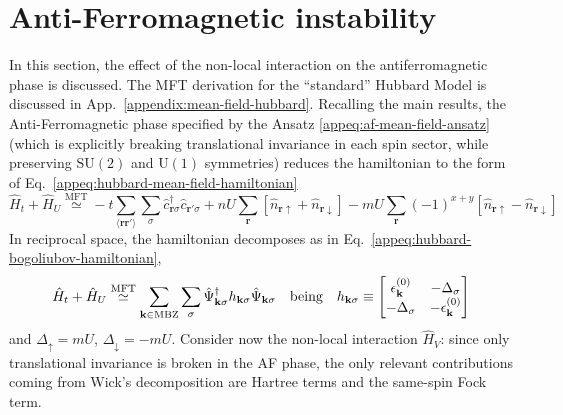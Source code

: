 \todo

\section{Anti-Ferromagnetic instability} 

In this section, the effect of the non-local interaction on the antiferromagnetic phase is discussed. The MFT derivation for the ``standard'' Hubbard Model is discussed in App.~\ref{appendix:mean-field-hubbard}. Recalling the main results, the Anti-Ferromagnetic phase specified by the Ansatz \eqref{appeq:af-mean-field-ansatz} (which is explicitly breaking translational invariance in each spin sector, while preserving $\mathrm{SU}(2)$ and $\mathrm{U}(1)$ symmetries) reduces the hamiltonian to the form of Eq.~\eqref{appeq:hubbard-mean-field-hamiltonian}
\[
	\hat H_t + \hat H_U \stackrel{\mathrm{MFT}}{\simeq} -t \sum_{\langle \mathbf{r}\mathbf{r}' \rangle} \sum_\sigma \hat c_{\mathbf{r}\sigma}^\dagger \hat c_{\mathbf{r}'\sigma}
	+ nU \sum_\mathbf{r} \left[
	\hat n_{\mathbf{r}\uparrow} + \hat n_{\mathbf{r}\downarrow}
	\right] - mU \sum_\mathbf{r} (-1)^{x+y} \left[
	\hat n_{\mathbf{r}\uparrow} - \hat n_{\mathbf{r}\downarrow}
	\right]
\]
In reciprocal space, the hamiltonian decomposes as in Eq.~\eqref{appeq:hubbard-bogoliubov-hamiltonian},
\[
	\hat H_t + \hat H_U \stackrel{\mathrm{MFT}}{\simeq} \sum_{\mathbf{k} \in \mathrm{MBZ}} \sum_\sigma \hat \Psi_{\mathbf{k}\sigma}^\dagger h_{\mathbf{k}\sigma} \hat \Psi_{\mathbf{k}\sigma}
	\qq{being}
	h_{\mathbf{k}\sigma} \equiv \begin{bmatrix}
		\epsilon_\mathbf{k}^{(0)} & -\Delta_\sigma \\
		-\Delta_\sigma & - \epsilon_\mathbf{k}^{(0)}
	\end{bmatrix}
\]
and $\Delta_\uparrow = mU$, $\Delta_\downarrow = -mU$. Consider now the non-local interaction $\hat H_V$: since only translational invariance is broken in the AF phase, the only relevant contributions coming from Wick's decomposition are Hartree terms and the same-spin Fock term.

